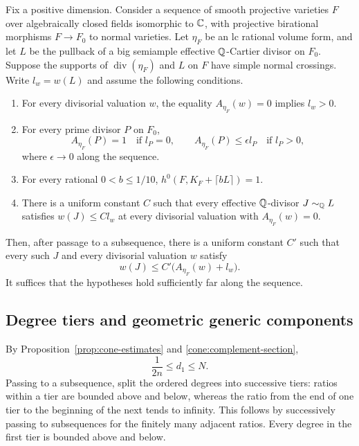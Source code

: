 \begin{proposition}\label{prop:integral-jump}
Fix a positive dimension.  Consider a sequence of smooth projective
varieties $F$ over algebraically closed fields isomorphic to $\mathbb C$, with
projective birational morphisms $F\to F_0$ to normal varieties.  Let
$\eta_F$ be an lc rational volume form, and let $L$ be the pullback of
a big semiample effective $\mathbb Q$-Cartier divisor on $F_0$.  Suppose the
supports of $\operatorname{div}(\eta_F)$ and $L$ on $F$ have simple
normal crossings.  Write $l_w=w(L)$ and assume the following conditions.
\begin{enumerate}[label=\textup{(\roman*)}]
\item For every divisorial valuation $w$, the equality
      $A_{\eta_F}(w)=0$ implies $l_w>0$.
\item For every prime divisor $P$ on $F_0$,
      \[
      A_{\eta_F}(P)=1\quad\text{if }l_P=0,
      \qquad
      A_{\eta_F}(P)\leq\epsilon l_P\quad\text{if }l_P>0,
      \]
      where $\epsilon\to0$ along the sequence.
\item For every rational $0<b\leq1/10$,
      $h^0(F,K_F+\lceil bL\rceil)=1$.
\item There is a uniform constant $C$ such that every effective
      $\mathbb Q$-divisor $J\sim_{\mathbb Q}L$ satisfies
      $w(J)\leq C l_w$ at every divisorial valuation with
      $A_{\eta_F}(w)=0$.
\end{enumerate}
Then, after passage to a subsequence, there is a uniform constant $C'$
such that every such $J$ and every divisorial valuation $w$ satisfy
\begin{equation}\label{prod:integral-jump-bound}
 w(J)\leq C'\bigl(A_{\eta_F}(w)+l_w\bigr).
\end{equation}
It suffices that the hypotheses hold sufficiently far along the sequence.
\end{proposition}

\subsection{Degree tiers and geometric generic components}

By Proposition~\ref{prop:cone-estimates} and
\eqref{cone:complement-section},
\[
 \frac1{2n}\leq d_1\leq N.
\]
Passing to a subsequence, split the ordered degrees into successive
tiers: ratios within a tier are bounded above and below, whereas the
ratio from the end of one tier to the beginning of the next tends to
infinity.  This follows by successively passing to subsequences for the
finitely many adjacent ratios.  Every degree in the first tier is
bounded above and below.


